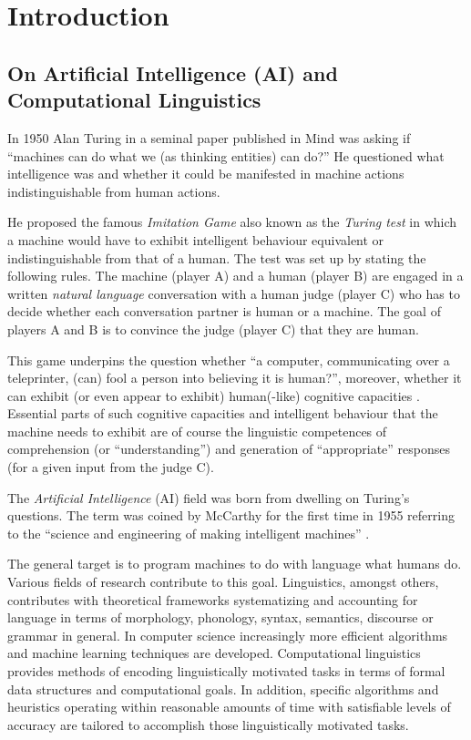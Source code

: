 \chapter{Introduction}
\label{ch:introduction}

\section{On Artificial Intelligence (AI) and Computational Linguistics}
In 1950 Alan Turing in a seminal paper \citep{Turing1950} published in Mind was asking if ``machines can do what we (as thinking entities) can do?'' He questioned what intelligence was and whether it could be manifested in machine actions indistinguishable from human actions. 

He proposed the famous \textit{Imitation Game} also known as the \textit{Turing test} in which a machine would have to exhibit intelligent behaviour equivalent or indistinguishable from that of a human. The test was set up by stating the following rules. The machine (player A) and a human (player B) are engaged in a written \textit{natural language} conversation with a human judge (player C) who has to decide whether each conversation partner is human or a machine. The goal of players A and B is to convince the judge (player C) that they are human. 

This game underpins the question whether ``a computer, communicating over a teleprinter, (can) fool a person into believing it is human?'', moreover, whether it can exhibit (or even appear to exhibit) human(-like) cognitive capacities \citep{Harnad1992}. Essential parts of such cognitive capacities and intelligent behaviour that the machine needs to exhibit are of course the linguistic competences of comprehension (or ``understanding'') and generation of ``appropriate'' responses (for a given input from the judge C).

The \textit{Artificial Intelligence} (AI) field was born from dwelling on Turing's questions. The term was coined by McCarthy for the first time in 1955 referring to the ``science and engineering of making intelligent machines'' \citep{McCarthy1955}.

The general target is to program machines to do with language what humans do. Various fields of research contribute to this goal. Linguistics, amongst others, contributes with theoretical frameworks systematizing and accounting for language in terms of morphology, phonology, syntax, semantics, discourse or grammar in general. In computer science increasingly more efficient algorithms and machine learning techniques are developed. Computational linguistics provides methods of encoding linguistically motivated tasks in terms of formal data structures and computational goals. In addition, specific algorithms and heuristics operating within reasonable amounts of time with satisfiable levels of accuracy are tailored to accomplish those linguistically motivated tasks.

